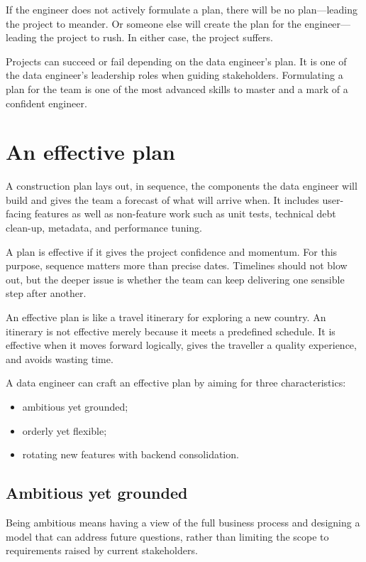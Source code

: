\documentclass[10pt,openany,10pt]{book}
\providecommand{\tightlist}{%
  \setlength{\itemsep}{0pt}\setlength{\parskip}{0pt}}
\begin{document}
If the engineer does not actively formulate a plan, there will be no
plan---leading the project to meander. Or someone else will create the
plan for the engineer---leading the project to rush. In either case, the
project suffers.

Projects can succeed or fail depending on the data engineer's plan. It
is one of the data engineer's leadership roles when guiding
stakeholders. Formulating a plan for the team is one of the most
advanced skills to master and a mark of a confident engineer.

\section{An effective plan}\label{an-effective-plan}

A construction plan lays out, in sequence, the components the data
engineer will build and gives the team a forecast of what will arrive
when. It includes user-facing features as well as non-feature work such
as unit tests, technical debt clean-up, metadata, and performance
tuning.

A plan is effective if it gives the project confidence and momentum. For
this purpose, sequence matters more than precise dates. Timelines should
not blow out, but the deeper issue is whether the team can keep
delivering one sensible step after another.

An effective plan is like a travel itinerary for exploring a new
country. An itinerary is not effective merely because it meets a
predefined schedule. It is effective when it moves forward logically,
gives the traveller a quality experience, and avoids wasting time.

A data engineer can craft an effective plan by aiming for three
characteristics:

\begin{itemize}
\tightlist
\item
  ambitious yet grounded;
\item
  orderly yet flexible;
\item
  rotating new features with backend consolidation.
\end{itemize}

\subsection{Ambitious yet grounded}\label{ambitious-yet-grounded}

Being ambitious means having a view of the full business process and
designing a model that can address future questions, rather than
limiting the scope to requirements raised by current stakeholders.
\end{document}
